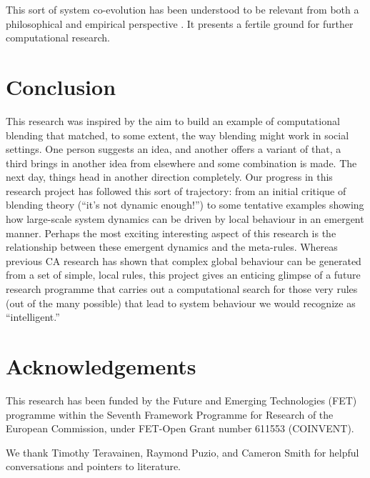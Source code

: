 \documentclass{AISB2008}
\begin{document}
This sort of system co-evolution has been understood to be relevant
from both a philosophical \cite{mead1932philosophy} and empirical
perspective \cite{van1973new}.  It presents a fertile ground for
further computational research.

\section{Conclusion}

This research was inspired by the aim to build an example of
computational blending that matched, to some extent, the way blending
might work in social settings.  One person suggests an idea, and
another offers a variant of that, a third brings in another idea from
elsewhere and some combination is made.  The next day, things head in
another direction completely.  Our progress in this research project
has followed this sort of trajectory: from an initial critique of
blending theory (``it's not dynamic enough!'') to some tentative
examples showing how large-scale system dynamics can be driven by
local behaviour in an emergent manner.  Perhaps the most exciting
interesting aspect of this research is the relationship between these
emergent dynamics and the meta-rules.  Whereas previous CA research
has shown that complex global behaviour can be generated from a set of
simple, local rules, this project gives an enticing glimpse of a
future research programme that carries out a computational search for
those very rules (out of the many possible) that lead to system
behaviour we would recognize as ``intelligent.''

\section{Acknowledgements}

This research has been funded by the Future and Emerging Technologies
(FET) programme within the Seventh Framework Programme for Research of
the European Commission, under FET-Open Grant number 611553
(COINVENT).

We thank Timothy Teravainen, Raymond Puzio, and Cameron Smith for
helpful conversations and pointers to literature.


\end{document}
